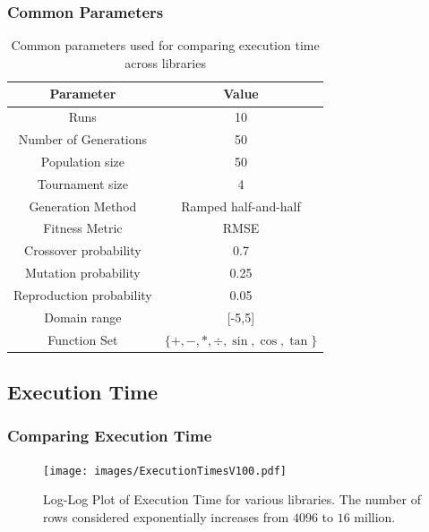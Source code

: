 \documentclass{beamer}
\begin{document}
\begin{frame}
  \frametitle{Common Parameters}
  \begin{table}
    \small
    \begin{tabular}[c]{cc}
      \toprule
      \textbf{Parameter} & \textbf{Value} \\
      \midrule
      Runs                      & 10      \\
      Number of Generations     & 50      \\
      Population size           & 50      \\
      Tournament size           & 4       \\ 
      Generation Method         & Ramped half-and-half \\
      Fitness Metric            & RMSE    \\
      Crossover probability     & 0.7     \\
      Mutation probability      & 0.25    \\
      Reproduction probability  & 0.05    \\
      Domain range              & [-5,5]  \\
      Function Set              & $\{+,-,*,\div,\sin ,\cos,\tan\}$ \\
      \bottomrule
    \end{tabular}
    \caption{Common parameters used for comparing execution time across libraries}
    \label{tab:params}
  \end{table}
\end{frame}

\subsection{Execution Time}
\begin{frame}
  \frametitle{Comparing Execution Time}
  \begin{figure}[ht]
    \centering
    \texttt{[image: images/ExecutionTimesV100.pdf]}
    \caption{Log-Log Plot of Execution Time for various libraries. The number of rows considered exponentially increases from $4096$ to $16$ million.}
    \label{fig:exectimes}
  \end{figure}
\end{frame}
\end{document}
